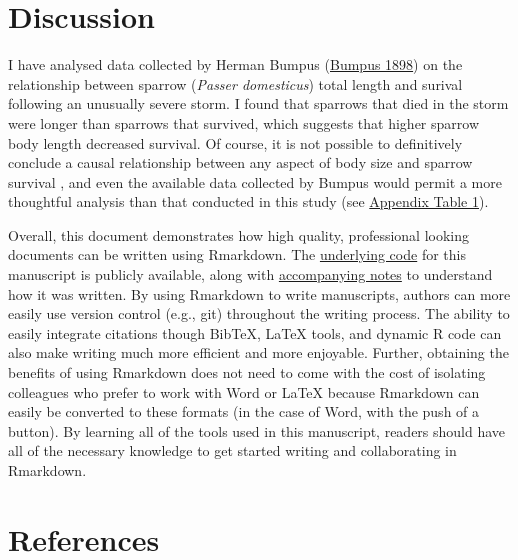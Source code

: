 \documentclass[
]{article}
\begin{document}
\hypertarget{discussion}{%
\section{Discussion}\label{discussion}}

I have analysed data collected by Herman Bumpus
(\protect\hyperlink{ref-Bumpus1898}{Bumpus 1898}) on the relationship
between sparrow (\emph{Passer domesticus}) total length and surival
following an unusually severe storm. I found that sparrows that died in
the storm were longer than sparrows that survived, which suggests that
higher sparrow body length decreased survival. Of course, it is not
possible to definitively conclude a causal relationship between any
aspect of body size and sparrow survival , and even the available data
collected by Bumpus would permit a more thoughtful analysis than that
conducted in this study (see \protect\hyperlink{appendix}{Appendix Table
1}).

Overall, this document demonstrates how high quality, professional
looking documents can be written using Rmarkdown. The
\href{https://github.com/StirlingCodingClub/Manuscripts_in_Rmarkdown/blob/master/ms.Rmd}{underlying
code} for this manuscript is publicly available, along with
\href{https://stirlingcodingclub.github.io/Manuscripts_in_Rmarkdown/Rmarkdown_notes.html}{accompanying
notes} to understand how it was written. By using Rmarkdown to write
manuscripts, authors can more easily use version control (e.g., git)
throughout the writing process. The ability to easily integrate
citations though BibTeX, LaTeX tools, and dynamic R code can also make
writing much more efficient and more enjoyable. Further, obtaining the
benefits of using Rmarkdown does not need to come with the cost of
isolating colleagues who prefer to work with Word or LaTeX because
Rmarkdown can easily be converted to these formats (in the case of Word,
with the push of a button). By learning all of the tools used in this
manuscript, readers should have all of the necessary knowledge to get
started writing and collaborating in Rmarkdown.

\hypertarget{references}{%
\section{References}\label{references}}
\end{document}
